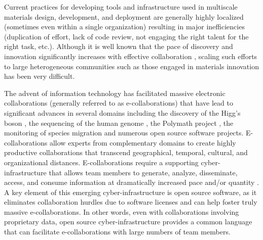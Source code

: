 \documentclass{bmcart}
\begin{document}
Current practices for developing tools and infrastructure used in multiscale materials design, development, and deployment are generally highly localized (sometimes even within a single organization) resulting in major inefficiencies (duplication of effort, lack of code review, not engaging the right talent for the right task, etc.). Although it is well known that the pace of discovery and innovation  significantly increases with effective collaboration \cite{sawhney2005collaborating, edwards2009open, bayne2008interdisciplinary, boudreau2010open}, scaling such efforts to large heterogeneous communities such as those engaged in materials innovation has been very difficult.

The advent of information technology has facilitated massive
electronic collaborations (generally referred to as e-collaborations)
that have lead to significant advances in several domains including
the discovery of the Higg's boson \cite{aad2012observation}, the
sequencing of the human genome \cite{lander2001initial}, the Polymath
project \cite{cranshaw2011polymath}, the monitoring of species
migration \cite{dickinson2010citizen, hochachka2012data} and numerous
open source software projects. E-collaborations allow experts from
complementary domains to create highly productive collaborations that
transcend geographical, temporal, cultural, and organizational
distances. E-collaborations require a supporting cyber-infrastructure
that allows team members to generate, analyze, disseminate, access,
and consume information at dramatically increased pace and/or quantity
\cite{atkins2003revolutionizing}. A key element of this emerging
cyber-infrastructure is open source software, as it eliminates
collaboration hurdles due to software licenses and can help foster
truly massive e-collaborations. In other words, even with
collaborations involving proprietary data, open source
cyber-infrastructure provides a common language that can facilitate
e-collaborations with large numbers of team members.
\end{document}
